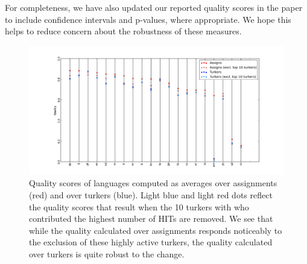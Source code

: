 \documentclass[11pt]{article}
\begin{document}
For completeness, we have also updated our reported quality scores in the paper to include confidence intervals and p-values, where appropriate. We hope this helps to reduce concern about the robustness of these measures.


\begin{figure}
\includegraphics[height=1\linewidth, angle=270]{figures/quality_compare.png}
\caption{Quality scores of languages computed as averages over assignments (red) and over turkers (blue). Light blue and light red dots reflect the quality scores that result when the 10 turkers with who contributed the highest number of HITs are removed. We see that while the quality calculated over assignments responds noticeably to the exclusion of these highly active turkers, the quality calculated over turkers is quite robust to the change.}
\label{qual_dots}
\end{figure}
\end{document}
